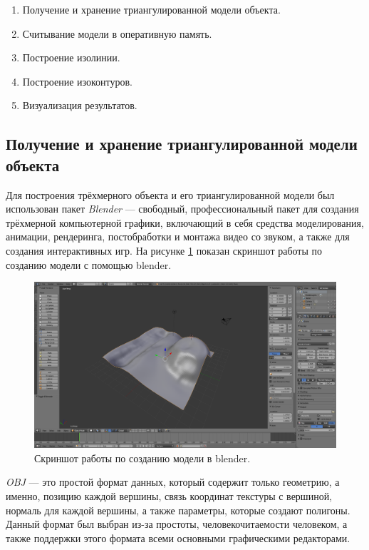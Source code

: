 \documentclass[12pt,a4paper,oneside]{extarticle}
\begin{document}
    \begin{enumerate}
        \item Получение и хранение триангулированной модели объекта. 
        \item Считывание модели в оперативную память.
        \item Построение изолинии.
        \item Построение изоконтуров.
        \item Визуализация результатов.
    \end{enumerate}
    \subsection{Получение и хранение триангулированной модели объекта}
        Для построения трёхмерного объекта и его триангулированной модели был использован пакет {\it Blender} --- свободный, профессиональный пакет для создания трёхмерной компьютерной графики, включающий в себя средства моделирования, анимации, рендеринга, постобработки и монтажа видео со звуком, а также для создания интерактивных игр. На рисунке \ref{pic:blender} показан скриншот работы по созданию модели с помощью blender.

        \begin{figure}[h!]
            \center
            \includegraphics[scale=0.2]{blender.png}
            \caption{Скриншот работы по созданию модели в blender.}
            \label{pic:blender}
        \end{figure}

        
        {\it OBJ} --- это простой формат данных, который содержит только геометрию, а именно, позицию каждой вершины, связь координат текстуры с вершиной, нормаль для каждой вершины, а также параметры, которые создают полигоны. Данный формат был выбран из-за простоты, человекочитаемости человеком, а также поддержки этого формата всеми основными графическими редакторами.
\end{document}
